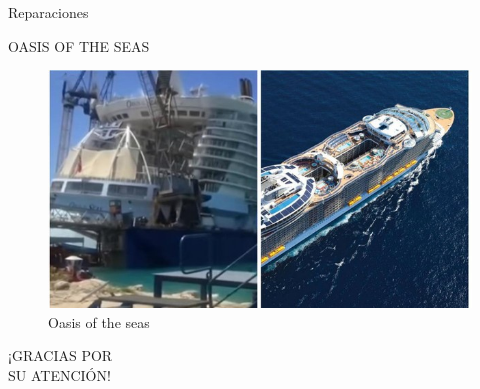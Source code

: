 \documentclass{beamer}
\begin{document}
\begin{frame}{Reparaciones}
\begin{center}
{\scshape \Huge OASIS OF THE SEAS}
\end{center}
\begin{figure}
	\includegraphics[scale=0.5]{oa1}
	\caption{Oasis of the seas}
\end{figure}

\end{frame}

	

\begin{frame}
\begin{center}
	{\scshape \Huge ¡GRACIAS POR \\ SU ATENCIÓN!}
\end{center}
\end{frame}
\begin{frame}
\titlepage
\end{frame}
	
\end{document}
